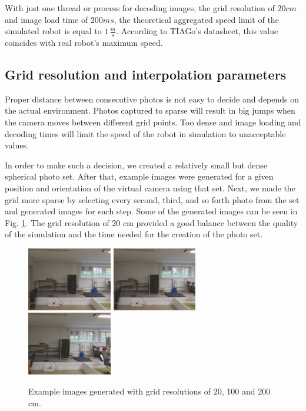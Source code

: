 \documentclass{svproc}
\begin{document}
With just one thread or process for decoding images, the grid resolution of $20 cm$ and image load time of $200 ms$, the theoretical aggregated speed limit of the simulated robot is equal to $1\,\frac{m}{s}$.
According to TIAGo's datasheet, this value coincides with real robot's maximum speed.

\subsection{Grid resolution and interpolation parameters}

Proper distance between consecutive photos is not easy to decide and depends on the
actual environment. Photos captured to sparse will result in big jumps when the camera
moves between different grid points. Too dense and image loading and decoding
times will limit the speed of the robot in simulation to unacceptable values.

In order to make such a decision, we created a relatively small but dense spherical photo set.
After that, example images were generated for a given position and orientation of the virtual camera using that set.
Next, we made the grid more sparse by selecting every second, third, and so forth photo from the set and generated images for each step.
Some of the generated images can be seen in Fig. \ref{fig:grid_sizes}.
The grid resolution of 20 cm provided a good balance between the quality of the simulation and the time needed for the creation of the photo set.

\begin{figure}[!ht]
    \centering
    \includegraphics[width=0.33\textwidth]{img/grid_sizes/10}\hfill%
    \includegraphics[width=0.33\textwidth]{img/grid_sizes/50}\hfill%
    \includegraphics[width=0.33\textwidth]{img/grid_sizes/100}\\
    \caption{Example images generated with grid resolutions of 20, 100 and 200 cm.}
    \label{fig:grid_sizes}
\end{figure}\vspace{-10mm}
\end{document}
